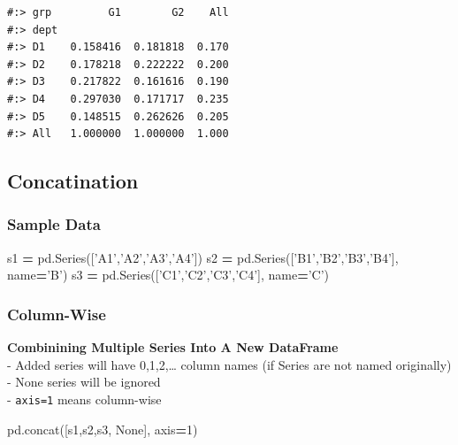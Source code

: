 \documentclass[
]{book}
\newenvironment{Shaded}{\begin{snugshade}}{\end{snugshade}}
\newcommand{\DecValTok}[1]{\textcolor[rgb]{0.06,0.06,0.06}{#1}}
\newcommand{\NormalTok}[1]{#1}
\newcommand{\OperatorTok}[1]{\textcolor[rgb]{0.43,0.43,0.43}{\textbf{#1}}}
\newcommand{\StringTok}[1]{\textcolor[rgb]{0.5,0.5,0.5}{#1}}
\newcommand{\VariableTok}[1]{\textcolor[rgb]{0,0,0}{#1}}
\begin{document}
\begin{verbatim}
#:> grp         G1        G2    All
#:> dept                           
#:> D1    0.158416  0.181818  0.170
#:> D2    0.178218  0.222222  0.200
#:> D3    0.217822  0.161616  0.190
#:> D4    0.297030  0.171717  0.235
#:> D5    0.148515  0.262626  0.205
#:> All   1.000000  1.000000  1.000
\end{verbatim}

\hypertarget{concatination}{%
\subsection{Concatination}\label{concatination}}

\hypertarget{sample-data-3}{%
\subsubsection{Sample Data}\label{sample-data-3}}

\begin{Shaded}
\begin{Highlighting}[]
\NormalTok{s1 }\OperatorTok{=}\NormalTok{ pd.Series([}\StringTok{'A1'}\NormalTok{,}\StringTok{'A2'}\NormalTok{,}\StringTok{'A3'}\NormalTok{,}\StringTok{'A4'}\NormalTok{])}
\NormalTok{s2 }\OperatorTok{=}\NormalTok{ pd.Series([}\StringTok{'B1'}\NormalTok{,}\StringTok{'B2'}\NormalTok{,}\StringTok{'B3'}\NormalTok{,}\StringTok{'B4'}\NormalTok{], name}\OperatorTok{=}\StringTok{'B'}\NormalTok{)}
\NormalTok{s3 }\OperatorTok{=}\NormalTok{ pd.Series([}\StringTok{'C1'}\NormalTok{,}\StringTok{'C2'}\NormalTok{,}\StringTok{'C3'}\NormalTok{,}\StringTok{'C4'}\NormalTok{], name}\OperatorTok{=}\StringTok{'C'}\NormalTok{)}
\end{Highlighting}
\end{Shaded}

\hypertarget{column-wise}{%
\subsubsection{Column-Wise}\label{column-wise}}

\textbf{Combinining Multiple Series Into A New DataFrame}\\
- Added series will have 0,1,2,\ldots{} column names (if Series are not named originally)\\
- None series will be ignored\\
- \texttt{axis=1} means column-wise

\begin{Shaded}
\begin{Highlighting}[]
\NormalTok{pd.concat([s1,s2,s3, }\VariableTok{None}\NormalTok{], axis}\OperatorTok{=}\DecValTok{1}\NormalTok{)}
\end{Highlighting}
\end{Shaded}
\end{document}

